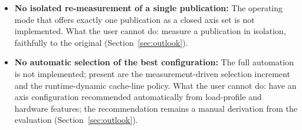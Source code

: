 \begin{nurkurz}
\begin{itemize}
  \item \textbf{No isolated re-measurement of a single publication:} The operating mode that offers
  exactly one publication as a closed axis set is not implemented. What the user cannot do: measure a
  publication in isolation, faithfully to the original (Section~\ref{sec:outlook}).
  \item \textbf{No automatic selection of the best configuration:} The full automation is not
  implemented; present are the measurement-driven selection increment and the runtime-dynamic cache-line
  policy. What the user cannot do: have an axis configuration recommended automatically from load-profile
  and hardware features; the recommendation remains a manual derivation from the evaluation
  (Section~\ref{sec:outlook}).
\end{itemize}
\end{nurkurz}

